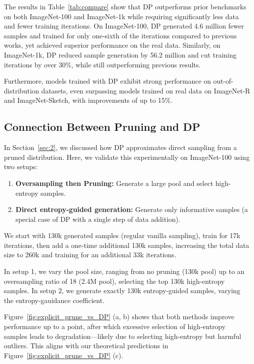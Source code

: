 The results in Table~\ref{tab:compare} show that DP outperforms prior benchmarks on both ImageNet-100 and ImageNet-1k while requiring significantly less data and fewer training iterations. On ImageNet-100, DP generated 4.6 million fewer samples and trained for only one-sixth of the iterations compared to previous works, yet achieved superior performance on the real data. Similarly, on ImageNet-1k, DP reduced sample generation by 56.2 million and cut training iterations by over 30\%, while still outperforming previous results.

Furthermore, models trained with DP exhibit strong performance on out-of-distribution datasets, even surpassing models trained on real data on ImageNet-R and ImageNet-Sketch, with improvements of up to 15\%.

\subsection{Connection Between Pruning and DP}

In Section~\ref{sec:2}, we discussed how DP approximates direct sampling from a pruned distribution. Here, we validate this experimentally on ImageNet-100 using two setups:
\begin{enumerate}
    \item \textbf{Oversampling then Pruning:} Generate a large pool and select high-entropy samples.
    \item \textbf{Direct entropy-guided generation:} Generate only informative samples (a special case of DP with a single step of data addition).
\end{enumerate}

We start with 130k generated samples (regular vanilla sampling), train for 17k iterations, then add a one-time additional 130k samples, increasing the total data size to 260k and training for an additional 33k iterations.

In setup 1, we vary the pool size, ranging from no pruning (130k pool) up to an oversampling ratio of 18 (2.4M pool), selecting the top 130k high-entropy samples. In setup 2, we generate exactly 130k entropy-guided samples, varying the entropy-gauidance coefficient.

Figure~\ref{fig:explicit_prune_vs_DP} (a, b) shows that both methods improve performance up to a point, after which excessive selection of high-entropy samples leads to degradation—likely due to selecting high-entropy but harmful outliers. This aligns with our theoretical predictions in Figure~\ref{fig:explicit_prune_vs_DP} (c).


